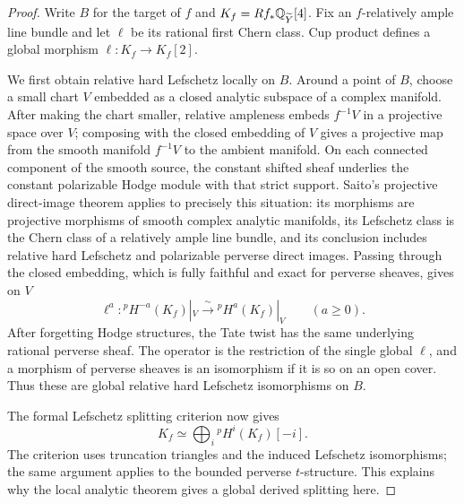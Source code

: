 \begin{proof}
Write $B$ for the target of $f$ and
$K_f=Rf_*\mathbb{Q}_{\widetilde Y}[4]$.  Fix an $f$-relatively ample line
bundle and let $\ell$ be its rational first Chern class.  Cup product
defines a global morphism $\ell\colon K_f\to K_f[2]$.

We first obtain relative hard Lefschetz locally on $B$.  Around a
point of $B$, choose a small chart $V$ embedded as a closed analytic
subspace of a complex manifold.  After making the chart smaller,
relative ampleness embeds $f^{-1}V$ in a projective space over $V$;
composing with the closed embedding of $V$ gives a projective map
from the smooth manifold $f^{-1}V$ to the ambient manifold.  On each
connected component of the smooth source, the constant shifted sheaf
underlies the constant polarizable Hodge module with that strict
support.  Saito's projective direct-image theorem
\cite[Theorem~5.3.1]{SaitoMHP} applies to precisely this situation:
its morphisms are projective morphisms of smooth complex analytic
manifolds, its Lefschetz class is the Chern class of a relatively ample
line bundle, and its conclusion includes relative hard Lefschetz and
polarizable perverse direct images.  Passing through the closed
embedding, which is fully faithful and exact for perverse sheaves,
gives on $V$
\[
 \ell^a\colon {}^p\!H^{-a}(K_f)|_V
            \xrightarrow{\ \sim\ }{}^p\!H^a(K_f)|_V
 \qquad(a\geq0).
\]
After forgetting Hodge structures, the Tate twist has the same
underlying rational perverse sheaf.  The operator is the restriction of the single
global $\ell$, and a morphism of perverse sheaves is an isomorphism
if it is so on an open cover.  Thus these are global relative hard
Lefschetz isomorphisms on $B$.

The formal Lefschetz splitting criterion
\cite[Theorem~1.5]{DeligneLefschetz} now gives
\begin{equation}\label{eq:branch-perverse-splitting}
 K_f\simeq\bigoplus_i{}^p\!H^i(K_f)[-i].
\end{equation}
The criterion uses truncation triangles and the induced Lefschetz
isomorphisms; the same argument applies to the bounded perverse
$t$-structure.  This explains why the local analytic theorem gives a
global derived splitting here.


\end{proof}
